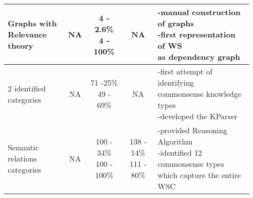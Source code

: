 \documentclass{article}
\begin{document}
{\begin{tabularx}{\linewidth}{ l| c c c l }
		\makecell{Graphs with \\Relevance theory \cite{DBLP:conf/kr/Schuller14}} & NA  & \makecell{4 - 2.6\% \\ 4 - 100\%} & NA &\makecell[l]{-manual construction of graphs\\-first representation of WS\\ as dependency graph}\\\hline

		\makecell{2 identified \\categories \cite{DBLP:conf/ijcai/SharmaVAB15}} & NA  & \makecell{71 -25\% \\ 49 - 69\%} & NA &\makecell[l]{-first attempt of identifying\\commonsense knowledge types \\-developed the KParser} \\\hline

		\makecell{Semantic relations\\ categories \cite{2018CommonsenseKT}} & NA &\makecell{100 - 34\% \\ 100 - 100\%} &  \makecell{138 - 14\% \\ 111 - 80\%} &\makecell[l]{-provided Reasoning Algorithm\\ -identified 12 commonsense types\\ which capture the entire WSC}  \\\hline
		
	\end{tabularx}
}
\end{document}
